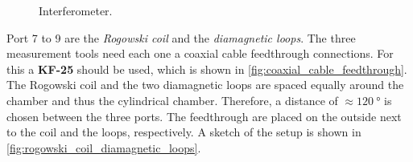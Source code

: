\begin{figure}[H]
\begin{subfigure}{0.59\textwidth}
        \label{fig:horn_antena_interferometer}
    \end{subfigure}
    \caption{Interferometer.}
    \label{fig:interferometer}
\end{figure}


Port 7 to 9 are the \emph{Rogowski coil} and the \emph{diamagnetic loops}.
The three measurement tools need each one a coaxial cable feedthrough connections.
For this a \textbf{KF-25} should be used, which is shown in \autoref{fig:coaxial_cable_feedthrough}.
The Rogowski coil and the two diamagnetic loops are spaced equally around the chamber and thus the cylindrical chamber.
Therefore, a distance of $\approx 120~\si{\degree}$ is chosen between the three ports.
The feedthrough are placed on the outside next to the coil and the loops, respectively.
A sketch of the setup is shown in \autoref{fig:rogowski_coil_diamagnetic_loops}.

